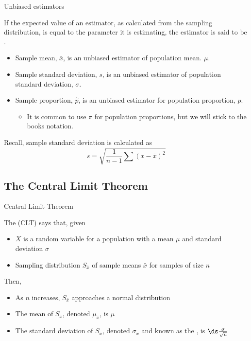 \documentclass[xcolor=table]{beamer}
\begin{document}
\begin{frame}{Unbiased estimators}
\begin{block}{}
\large If the expected value of an estimator, as calculated from the sampling distribution, is equal to the parameter it is estimating, the estimator is said to be . 
\begin{itemize}
\pause\item Sample mean, $\bar x$, is an unbiased estimator of population mean. $\mu$.
\pause\item Sample standard deviation, $s$, is an unbiased estimator of population standard deviation, $\sigma$.
\pause\item Sample proportion, $\hat p$, is an unbiased estimator for population proportion, $p$.
\begin{itemize}
\item It is common to use $\pi$ for population proportions, but we will stick to the books notation. 
\end{itemize}
\end{itemize}
\end{block}

\pause
\begin{alertblock}{}
Recall, sample standard deviation is calculated as 
\[s = \sqrt{\frac 1 {n-1} \sum (x - \bar x)^2}\]
\end{alertblock}
\end{frame}

\subsection{The Central Limit Theorem}

\begin{frame}{Central Limit Theorem}
\begin{block}{}
\large
The  (CLT) says that, given
\begin{itemize}
\pause\item $X$ is a random variable for a population with a mean $\mu$ and standard deviation $\sigma$
\pause\item Sampling distribution $S_{\bar x}$ of sample means $\bar x$ for samples of size $n$
\end{itemize}
\pause Then,
\begin{itemize}
\item As $n$ increases, $S_{\bar x}$ approaches a normal distribution
\pause\item The mean of $S_{\bar x}$, denoted $\mu_{\bar x}$, is $\mu$
\pause\item The standard deviation of $S_{\bar x}$, denoted $\sigma_{\bar x}$ and known as the , is $\ds \frac \sigma {\sqrt n}$  
\end{itemize}
\end{block}
\end{frame}
\end{document}
